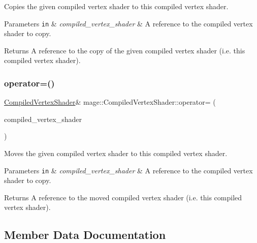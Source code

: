 Copies the given compiled vertex shader to this compiled vertex shader.


\begin{DoxyParams}[1]{Parameters}
\mbox{\tt in}  & {\em compiled\+\_\+vertex\+\_\+shader} & A reference to the compiled vertex shader to copy. \\
\hline
\end{DoxyParams}
\begin{DoxyReturn}{Returns}
A reference to the copy of the given compiled vertex shader (i.\+e. this compiled vertex shader). 
\end{DoxyReturn}
\hypertarget{structmage_1_1_compiled_vertex_shader_ae42ff3528b8a4b58c3d9f085d0d4573e}{}\label{structmage_1_1_compiled_vertex_shader_ae42ff3528b8a4b58c3d9f085d0d4573e} 
\subsubsection{\texorpdfstring{operator=()}{operator=()}\hspace{0.1cm}{\footnotesize\ttfamily [2/2]}}
{\footnotesize\ttfamily \hyperlink{structmage_1_1_compiled_vertex_shader}{Compiled\+Vertex\+Shader}\& mage\+::\+Compiled\+Vertex\+Shader\+::operator= (\begin{DoxyParamCaption}\item[{\hyperlink{structmage_1_1_compiled_vertex_shader}{Compiled\+Vertex\+Shader} \&\&}]{compiled\+\_\+vertex\+\_\+shader }\end{DoxyParamCaption})\hspace{0.3cm}{\ttfamily [delete]}}

Moves the given compiled vertex shader to this compiled vertex shader.


\begin{DoxyParams}[1]{Parameters}
\mbox{\tt in}  & {\em compiled\+\_\+vertex\+\_\+shader} & A reference to the compiled vertex shader to copy. \\
\hline
\end{DoxyParams}
\begin{DoxyReturn}{Returns}
A reference to the moved compiled vertex shader (i.\+e. this compiled vertex shader). 
\end{DoxyReturn}


\subsection{Member Data Documentation}
\hypertarget{structmage_1_1_compiled_vertex_shader_aa561d0238dcf7b76674bc530269b5539}{}\label{structmage_1_1_compiled_vertex_shader_aa561d0238dcf7b76674bc530269b5539} 
